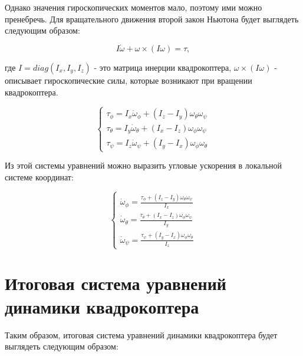 Однако значения гироскопических моментов мало, поэтому ими можно пренебречь.
Для вращательного движения второй закон Ньютона будет выглядеть следующим образом:

\begin{equation}
I\dot{\omega}+\omega \times (I \omega) = \tau,
\end{equation}

где \(I=diag(I_{x}, I_{y}, I_{z})\) - это матрица инерции квадрокоптера, \(\omega \times (I \omega)\) - описывает гироскопические силы, которые возникают при вращении квадрокоптера.

\begin{equation}
\begin{cases}
    \tau_{\phi} =  I_{x} \dot{\omega}_{\phi} + (I_z-I_y) \omega_{\theta} \omega_{\psi} \\
    \tau_{\theta} = I_{y} \dot{\omega}_{\theta} + (I_x-I_z) \omega_{\phi} \omega_{\psi} \\
    \tau_{\psi} = I_{z} \dot{\omega}_{\psi} + (I_y-I_x) \omega_{\phi} \omega_{\theta} 
\end{cases}
\end{equation}

Из этой системы уравнений можно выразить угловые ускорения в локальной системе координат:

\begin{equation}
\begin{cases}
    \dot{\omega}_{\phi} = \frac{\tau_{\phi}+(I_z-I_y) \omega_{\theta} \omega_{\psi}}{I_{x}} \\
    \dot{\omega}_{\theta} = \frac{\tau_{\theta}+(I_x-I_z) \omega_{\phi} \omega_{\psi}}{I_{y}} \\
    \dot{\omega}_{\psi} = \frac{\tau_{\psi}+(I_y-I_x) \omega_{\phi} \omega_{\theta}}{I_{z}}
\end{cases}
\end{equation}

\section{Итоговая система уравнений динамики квадрокоптера}

Таким образом, итоговая система уравнений динамики квадрокоптера будет выглядеть следующим образом:

